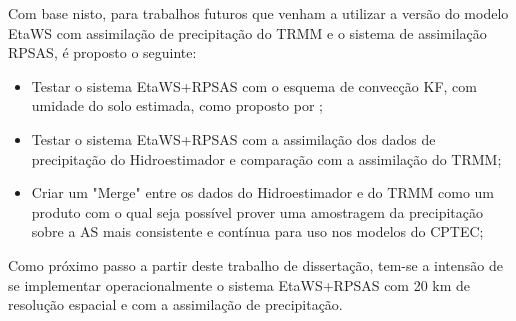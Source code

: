 Com base nisto, para trabalhos futuros que venham a utilizar a versão do modelo EtaWS com assimilação de precipitação do TRMM e o sistema de assimilação RPSAS, é proposto o seguinte:

\begin{itemize}
\item Testar o sistema EtaWS+RPSAS com o esquema de convecção KF, com umidade do solo estimada, como proposto por ;
\item Testar o sistema EtaWS+RPSAS com a assimilação dos dados de precipitação do Hidroestimador e comparação com a assimilação do TRMM;
\item Criar um "Merge" entre os dados do Hidroestimador e do TRMM como um produto com o qual seja possível prover uma amostragem da precipitação sobre a AS mais consistente e contínua para uso nos modelos do CPTEC;
\end{itemize}

Como próximo passo a partir deste trabalho de dissertação, tem-se a intensão de se implementar operacionalmente o sistema EtaWS+RPSAS com 20 km de resolução espacial e com a assimilação de precipitação.
